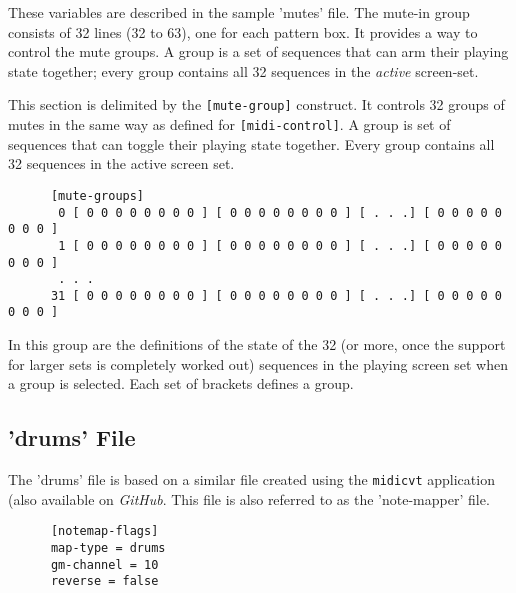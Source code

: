    These variables are described in the sample 'mutes' file.
   The mute-in group consists of 32 lines (32 to 63), one for each
   pattern box.
   It provides a way to control the mute groups.
   A group is a set of sequences that can arm their playing state
   together; every group contains all 32 sequences in the
   \textsl{active} screen-set.

   This section is delimited by the \texttt{[mute-group]} construct.
   It controls 32 groups of mutes in the same way as defined for
   \texttt{[midi-control]}. A group is set of sequences that can toggle their
   playing state together.  Every group contains all 32 sequences in the
   active screen set.

   \begin{verbatim}
      [mute-groups]
       0 [ 0 0 0 0 0 0 0 0 ] [ 0 0 0 0 0 0 0 0 ] [ . . .] [ 0 0 0 0 0 0 0 0 ]
       1 [ 0 0 0 0 0 0 0 0 ] [ 0 0 0 0 0 0 0 0 ] [ . . .] [ 0 0 0 0 0 0 0 0 ]
       . . .
      31 [ 0 0 0 0 0 0 0 0 ] [ 0 0 0 0 0 0 0 0 ] [ . . .] [ 0 0 0 0 0 0 0 0 ]
   \end{verbatim}

   In this group are the definitions of the state of the 32 (or more, once the
   support for larger sets is completely worked out) sequences
   in the playing screen set when a group is selected.
   Each set of brackets defines a group.
%

\subsection{'drums' File}
\label{subsec:configuration_drums}

   The 'drums' file is based on a similar file created using the
   \texttt{midicvt} application (also available on \textsl{GitHub}.  This file
   is also referred to as the 'note-mapper' file.

   \begin{verbatim}
      [notemap-flags]
      map-type = drums
      gm-channel = 10
      reverse = false
   \end{verbatim}

